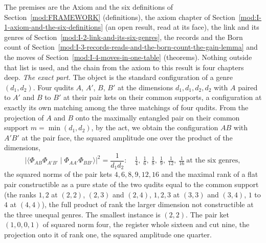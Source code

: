 \begin{chproof}
The premises are the Axiom and the six definitions of Section~\ref{mod:FRAMEWORK} (definitions), the axiom chapter of Section~\ref{mod:I-1-axiom-and-the-six-definitions} (an open result, read at its face), the link and its genres of Section~\ref{mod:I-2-link-and-its-six-genres}, the records and the Born count of Section~\ref{mod:I-3-records-reads-and-the-born-count-the-gain-lemma} and the moves of Section~\ref{mod:I-4-moves-in-one-table} (theorems). Nothing outside that list is used, and the chain from the axiom to this result is four chapters deep.
\emph{The exact part.} The object is the standard configuration of a genre $(d_{1}, d_{2})$. Four qudits $A$, $A'$, $B$, $B'$ at the dimensions $d_{1}, d_{1}, d_{2}, d_{2}$ with $A$ paired to $A'$ and $B$ to $B'$ at their pair kets on their common supports, a configuration at exactly its own matching among the three matchings of four qudits. From the projection of $A$ and $B$ onto the maximally entangled pair on their common support $m = \min(d_{1}, d_{2})$, by the act, we obtain the configuration $AB$ with $A'B'$ at the pair face, the squared amplitude one over the product of the dimensions,
\begin{equation}
\lvert \langle \Phi_{AB} \Phi_{A'B'} \mid \Phi_{AA'} \Phi_{BB'} \rangle \rvert^{2} = \frac{1}{d_{1} d_{2}}: \quad \tfrac{1}{4}, \ \tfrac{1}{6}, \ \tfrac{1}{8}, \ \tfrac{1}{9}, \ \tfrac{1}{12}, \ \tfrac{1}{16} \ \text{at the six genres},
\end{equation}
the squared norms of the pair kets $4, 6, 8, 9, 12, 16$ and the maximal rank of a flat pair constructible as a pure state of the two qudits equal to the common support (the ranks $1, 2$ at $(2,2)$, $(2,3)$ and $(2,4)$, $1, 2, 3$ at $(3,3)$ and $(3,4)$, $1$ to $4$ at $(4,4)$), the full product of rank the larger dimension not constructible at the three unequal genres. The smallest instance is $(2,2)$. The pair ket $(1, 0, 0, 1)$ of squared norm four, the register whole sixteen and cut nine, the projection onto it of rank one, the squared amplitude one quarter.

\end{chproof}
